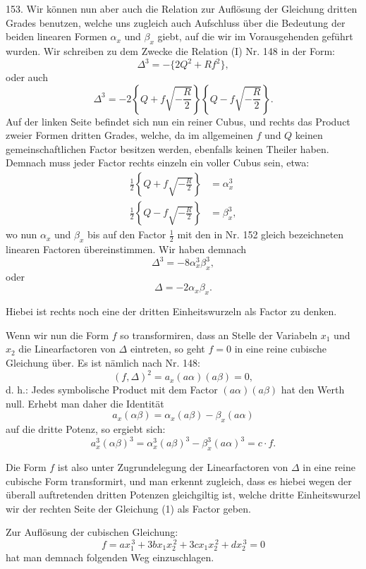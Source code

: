 \documentclass[11pt]{article}
\providecommand{\gesperrt}[1]{\textls[130]{#1}}
\providecommand{\weberpage}[1]{}
\providecommand{\weq}[2]{\begin{equation}\tag{#1}#2\end{equation}}
\let\Delta\varDelta
\begin{document}
153. Wir können nun aber auch die \gesperrt{Cayley'sche} Relation zur Auflösung der Gleichung dritten Grades benutzen, welche uns zugleich auch Aufschluss über die Bedeutung der beiden linearen Formen $\alpha_x$ und $\beta_x$ giebt, auf die wir im Vorausgehenden geführt wurden. Wir schreiben zu dem Zwecke die Relation (I) Nr. 148 in der Form:
\[
\Delta^3 = -\{2Q^2 + Rf^2\},
\]
oder auch
\[
\Delta^3 = -2\left\{Q+f\sqrt{-\frac{R}{2}}\right\}\left\{Q-f\sqrt{-\frac{R}{2}}\right\}.
\]
Auf der linken Seite befindet sich nun ein reiner Cubus, und rechts das Product zweier Formen dritten Grades, welche, da im allgemeinen $f$ und $Q$ keinen gemeinschaftlichen Factor besitzen werden, ebenfalls keinen Theiler haben. Demnach muss jeder Factor rechts einzeln ein voller Cubus sein, etwa:
\[
\begin{aligned}
\frac{1}{2}\left\{Q+f\sqrt{-\frac{R}{2}}\right\} &= \alpha_x^3\\
\frac{1}{2}\left\{Q-f\sqrt{-\frac{R}{2}}\right\} &= \beta_x^3,
\end{aligned}
\]
wo nun $\alpha_x$ und $\beta_x$ bis auf den Factor $\frac{1}{2}$ mit den in Nr. 152 gleich bezeichneten linearen Factoren übereinstimmen. Wir haben demnach
\[
\Delta^3 = -8\alpha_x^3\beta_x^3,
\]
oder
\weq{1}{\Delta = -2\alpha_x\beta_x.}


\weberpage{177}

Hiebei ist rechts noch eine der dritten Einheitswurzeln als Factor zu denken.

Wenn wir nun die Form $f$ so transformiren, dass an Stelle der Variabeln $x_1$ und $x_2$ die Linearfactoren von $\Delta$ eintreten, so geht $f=0$ in eine reine cubische Gleichung über. Es ist nämlich nach Nr. 148:
\[
(f,\Delta)^2=a_x(a\alpha)(a\beta)=0,
\]
d. h.: \glqq Jedes symbolische Product mit dem Factor $(a\alpha)(a\beta)$ hat den Werth null.\grqq{} Erhebt man daher die Identität
\[
a_x(\alpha\beta)=\alpha_x(a\beta)-\beta_x(a\alpha)
\]
auf die dritte Potenz, so ergiebt sich:
\weq{2}{a_x^3(\alpha\beta)^3=\alpha_x^3(a\beta)^3-\beta_x^3(a\alpha)^3=c\cdot f.}

Die Form $f$ ist also unter Zugrundelegung der Linearfactoren von $\Delta$ in eine reine cubische Form transformirt, und man erkennt zugleich, dass es hiebei wegen der überall auftretenden dritten Potenzen gleichgiltig ist, welche dritte Einheitswurzel wir der rechten Seite der Gleichung (1) als Factor geben.

Zur Auflösung der cubischen Gleichung:
\[
f=ax_1^{\,3}+3bx_1x_2^{\,2}+3cx_1x_2^{\,2}+dx_2^{\,3}=0
\] %
hat man demnach folgenden Weg einzuschlagen.
\end{document}
